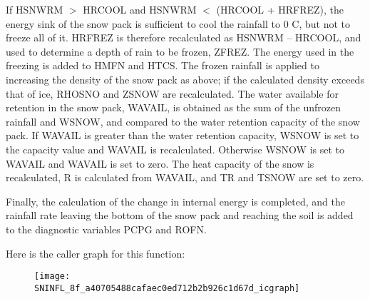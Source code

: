 If H\+S\+N\+W\+R\+M $>$ H\+R\+C\+O\+O\+L and H\+S\+N\+W\+R\+M $<$ (H\+R\+C\+O\+O\+L + H\+R\+F\+R\+E\+Z), the energy sink of the snow pack is sufficient to cool the rainfall to 0 C, but not to freeze all of it. H\+R\+F\+R\+E\+Z is therefore recalculated as H\+S\+N\+W\+R\+M – H\+R\+C\+O\+O\+L, and used to determine a depth of rain to be frozen, Z\+F\+R\+E\+Z. The energy used in the freezing is added to H\+M\+F\+N and H\+T\+C\+S. The frozen rainfall is applied to increasing the density of the snow pack as above; if the calculated density exceeds that of ice, R\+H\+O\+S\+N\+O and Z\+S\+N\+O\+W are recalculated. The water available for retention in the snow pack, W\+A\+V\+A\+I\+L, is obtained as the sum of the unfrozen rainfall and W\+S\+N\+O\+W, and compared to the water retention capacity of the snow pack. If W\+A\+V\+A\+I\+L is greater than the water retention capacity, W\+S\+N\+O\+W is set to the capacity value and W\+A\+V\+A\+I\+L is recalculated. Otherwise W\+S\+N\+O\+W is set to W\+A\+V\+A\+I\+L and W\+A\+V\+A\+I\+L is set to zero. The heat capacity of the snow is recalculated, R is calculated from W\+A\+V\+A\+I\+L, and T\+R and T\+S\+N\+O\+W are set to zero.

Finally, the calculation of the change in internal energy is completed, and the rainfall rate leaving the bottom of the snow pack and reaching the soil is added to the diagnostic variables P\+C\+P\+G and R\+O\+F\+N.

Here is the caller graph for this function\+:\nopagebreak
\begin{figure}[H]
\begin{center}
\leavevmode
\texttt{[image: SNINFL\_8f\_a40705488cafaec0ed712b2b926c1d67d\_icgraph]}
\end{center}
\end{figure}


